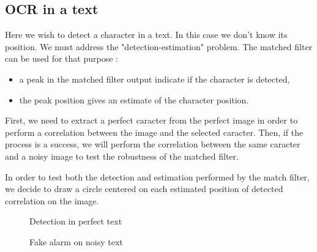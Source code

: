 \subsection{OCR in a text}
Here we wish to detect a character in a text. In this case we don't know its position. We must address the "detection-estimation" problem. The matched filter can be used for that purpose :
\begin{itemize}
    \item a peak in the matched filter output indicate if the character is detected,
    \item the peak position gives an estimate of the character position.
\end{itemize}

First, we need to extract a perfect caracter from the perfect image in order to perform a correlation between the image and the selected caracter. Then, if the process is a success, we will perform the correlation between the same caracter and a noisy image to test the robustness of the matched filter.

In order to test both the detection and estimation performed by the match filter, we decide to draw a circle centered on each estimated position of detected correlation on the image.

\begin{figure}[h]
    \centering
	\caption{Detection in perfect text}
\end{figure}

\begin{figure}[h]
    \centering
	\caption{Fake alarm on noisy text}
\end{figure}
\pagebreak